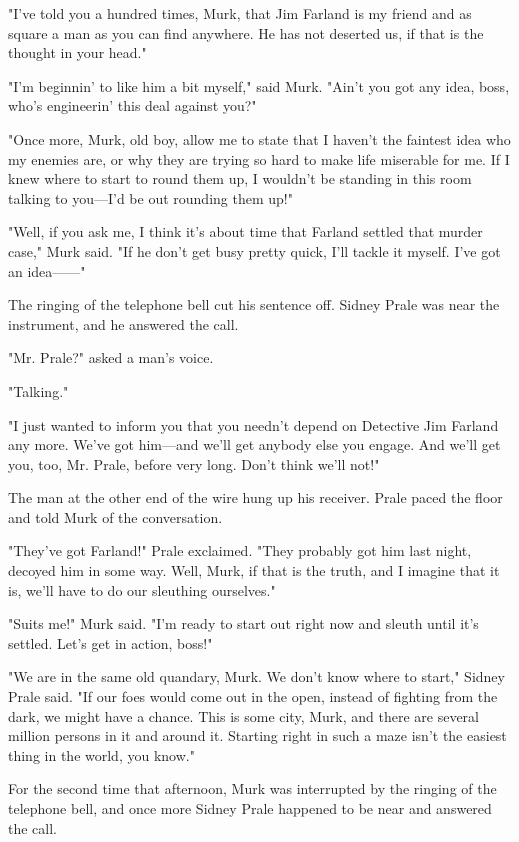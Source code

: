 \documentclass{novel}
\begin{document}
"I've told you a hundred times, Murk, that Jim Farland is my friend and as square a man as you can find anywhere. He has not deserted us, if that is the thought in your head."

"I'm beginnin' to like him a bit myself," said Murk. "Ain't you got any idea, boss, who's engineerin' this deal against you?"

"Once more, Murk, old boy, allow me to state that I haven't the faintest idea who my enemies are, or why they are trying so hard to make life miserable for me. If I knew where to start to round them up, I wouldn't be standing in this room talking to you---I'd be out rounding them up!"

"Well, if you ask me, I think it's about time that Farland settled that murder case," Murk said. "If he don't get busy pretty quick, I'll tackle it myself. I've got an idea------"

The ringing of the telephone bell cut his sentence off. Sidney Prale was near the instrument, and he answered the call.

"Mr. Prale?" asked a man's voice.

"Talking."

"I just wanted to inform you that you needn't depend on Detective Jim Farland any more. We've got him---and we'll get anybody else you engage. And we'll get you, too, Mr. Prale, before very long. Don't think we'll not!"

The man at the other end of the wire hung up his receiver. Prale paced the floor and told Murk of the conversation.

"They've got Farland!" Prale exclaimed. "They probably got him last night, decoyed him in some way. Well, Murk, if that is the truth, and I imagine that it is, we'll have to do our sleuthing ourselves."

"Suits me!" Murk said. "I'm ready to start out right now and sleuth until it's settled. Let's get in action, boss!"

"We are in the same old quandary, Murk. We don't know where to start," Sidney Prale said. "If our foes would come out in the open, instead of fighting from the dark, we might have a chance. This is some city, Murk, and there are several million persons in it and around it. Starting right in such a maze isn't the easiest thing in the world, you know."

For the second time that afternoon, Murk was interrupted by the ringing of the telephone bell, and once more Sidney Prale happened to be near and answered the call.
\end{document}
